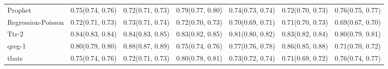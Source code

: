 \begin{tabular}{l p{} p{} p{} p{} p{} p{}}
Prophet & {0.75\newline(0.74, 0.76)} & {0.72\newline(0.71, 0.73)} & {0.79\newline(0.77, 0.80)} & {0.74\newline(0.73, 0.74)} & {0.72\newline(0.70, 0.73)} & {0.76\newline(0.75, 0.77)} \\
Regression-Poisson & {0.72\newline(0.71, 0.73)} & {0.73\newline(0.71, 0.74)} & {0.72\newline(0.70, 0.73)} & {0.70\newline(0.69, 0.71)} & {0.71\newline(0.70, 0.73)} & {0.69\newline(0.67, 0.70)} \\
Ttr-2 & {0.84\newline(0.83, 0.84)} & {0.84\newline(0.83, 0.85)} & {0.83\newline(0.82, 0.85)} & {0.81\newline(0.80, 0.82)} & {0.83\newline(0.82, 0.84)} & {0.80\newline(0.79, 0.81)} \\
qreg-1 & {0.80\newline(0.79, 0.80)} & {0.88\newline(0.87, 0.89)} & {0.75\newline(0.74, 0.76)} & {0.77\newline(0.76, 0.78)} & {0.86\newline(0.85, 0.88)} & {0.71\newline(0.70, 0.72)} \\
tbats & {0.75\newline(0.74, 0.76)} & {0.72\newline(0.71, 0.73)} & {0.80\newline(0.78, 0.81)} & {0.73\newline(0.72, 0.74)} & {0.71\newline(0.69, 0.72)} & {0.76\newline(0.74, 0.77)} \\
\bottomrule
\end{tabular}
